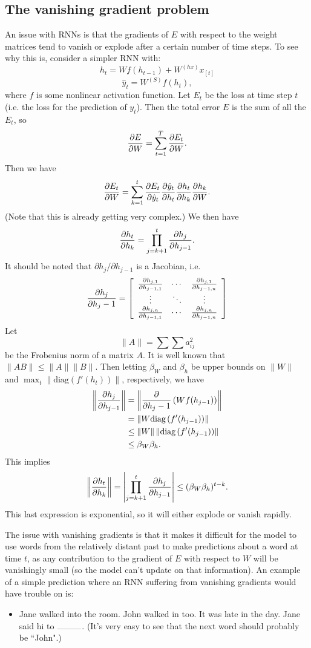 \subsection{The vanishing gradient problem}
An issue with RNNs is that the gradients of $E$ with respect to the weight matrices tend to vanish or explode after a certain number of time steps. To see why this is, consider a simpler RNN with:
$$h_t = Wf(h_{t-1}) + W^{(hx)}x_{[t]}$$
$$\hat{y}_t = W^{(S)}f(h_t),$$
where $f$ is some nonlinear activation function. Let $E_t$ be the loss at time step $t$ (i.e. the loss for the prediction of $y_t$). Then the total error $E$ is the sum of all the $E_t$, so
$$\frac{\partial E}{\partial W} = \sum_{t=1}^T \frac{\partial E_t}{\partial W}.$$
Then we have
$$\frac{\partial E_t}{\partial W} = \sum_{k=1}^t \frac{\partial E_t}{\partial \hat{y}_t} \frac{\partial \hat{y}_t}{\partial h_t} \frac{\partial h_t}{\partial h_k} \frac{\partial h_k}{\partial W}.$$
(Note that this is already getting very complex.) We then have
$$\frac{\partial h_t}{\partial h_k} = \prod_{j=k+1}^t \frac{\partial h_j}{\partial h_{j-1}}.$$
It should be noted that $\partial h_j / \partial h_{j-1}$ is a Jacobian, i.e.
$$\frac{\partial h_j}{\partial h_j-1} = \left[
\begin{array}{ccc}
\frac{\partial h_{j, 1}}{\partial h_{j-1, 1}} & \cdots & \frac{\partial h_{j, 1}}{\partial h_{j-1, n}} \\
\vdots & \ddots & \vdots \\
\frac{\partial h_{j, n}}{\partial h_{j-1, 1}} & \cdots & \frac{\partial h_{j, n}}{\partial h_{j-1, n}} \\
\end{array}
\right]$$
Let
$$\|A\| = \sum\sum a_{ij}^2$$
be the Frobenius norm of a matrix $A$. It is well known that $\|AB\| \le \|A\|\|B\|.$ Then letting $\beta_W$ and $\beta_h$ be upper bounds on $\|W\|$ and $\max_t \|\text{diag}(f'(h_t))\|$, respectively, we have
\begin{align*}
\left\| \frac{\partial h_j}{\partial h_{j-1}} \right\| &= \left\| \frac{\partial }{\partial h_j-1}\left(Wf(h_{j-1})\right)\right\| \\
&= \left\|W \text{diag}\left(f'(h_{j-1})\right)\right\| \\
&\le \left\|W\right\|\left\| \text{diag}\left(f'(h_{j-1})\right) \right\| \\
&\le \beta_W \beta_h.
\end{align*}
This implies
$$\left\|\frac{\partial h_t}{\partial h_k}\right\| = \left| \prod_{j=k+1}^t \frac{\partial h_j}{\partial h_{j-1}} \right| \le (\beta_W \beta_h)^{t-k}.$$
This last expression is exponential, so it will either explode or vanish rapidly.

The issue with vanishing gradients is that it makes it difficult for the model to use words from the relatively distant past to make predictions about a word at time $t$, as any contribution to the gradient of $E$ with respect to $W$ will be vanishingly small (so the model can't update on that information). An example of a simple prediction where an RNN suffering from vanishing gradients would have trouble on is:
\begin{itemize}
\item Jane walked into the room. John walked in too. It was late in the day. Jane said hi to $\rule{1cm}{0.1mm}$. (It's very easy to see that the next word should probably be ``John".)
\end{itemize}

